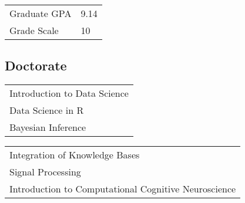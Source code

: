 \hspace{1cm}\begin{tabular}{l p{}}
Graduate GPA & 9.14 \\
Grade Scale & 10 \\
\end{tabular}

\sectionspace
\subsection{Doctorate}
\begin{minipage}{0.48\textwidth}
\hspace{1cm}\begin{tabular}{l}
Introduction to Data Science\\
Data Science in R\\
Bayesian Inference \\
\end{tabular}
\end{minipage}
\begin{minipage}{0.49\textwidth}
\hspace{1cm}\begin{tabular}{l}
Integration of Knowledge Bases  \\
Signal Processing  \\
Introduction to Computational Cognitive Neuroscience  \\
\end{tabular}
\end{minipage}
